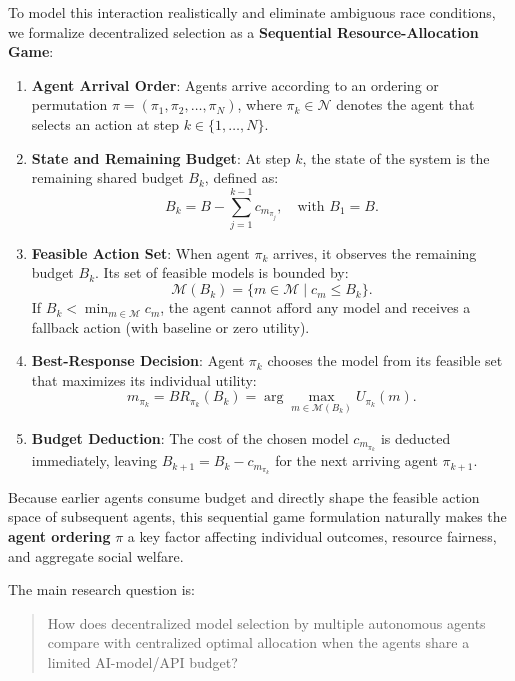 \documentclass{article}
\begin{document}
To model this interaction realistically and eliminate ambiguous race conditions, we formalize decentralized selection as a \textbf{Sequential Resource-Allocation Game}:
\begin{enumerate}[leftmargin=*]
    \item \textbf{Agent Arrival Order}: Agents arrive according to an ordering or permutation $\pi = (\pi_1, \pi_2, \ldots, \pi_N)$, where $\pi_k \in \mathcal{N}$ denotes the agent that selects an action at step $k \in \{1, \ldots, N\}$.
    \item \textbf{State and Remaining Budget}: At step $k$, the state of the system is the remaining shared budget $B_k$, defined as:
    \begin{equation}
        B_k = B - \sum_{j=1}^{k-1} c_{m_{\pi_j}}, \quad \text{with } B_1 = B.
    \end{equation}
    \item \textbf{Feasible Action Set}: When agent $\pi_k$ arrives, it observes the remaining budget $B_k$. Its set of feasible models is bounded by:
    \begin{equation}
        \mathcal{M}(B_k) = \{ m \in \mathcal{M} \mid c_m \leq B_k \}.
    \end{equation}
    If $B_k < \min_{m \in \mathcal{M}} c_m$, the agent cannot afford any model and receives a fallback action (with baseline or zero utility).
    \item \textbf{Best-Response Decision}: Agent $\pi_k$ chooses the model from its feasible set that maximizes its individual utility:
    \begin{equation}
        m_{\pi_k} = BR_{\pi_k}(B_k) = \arg\max_{m \in \mathcal{M}(B_k)} U_{\pi_k}(m).
    \end{equation}
    \item \textbf{Budget Deduction}: The cost of the chosen model $c_{m_{\pi_k}}$ is deducted immediately, leaving $B_{k+1} = B_k - c_{m_{\pi_k}}$ for the next arriving agent $\pi_{k+1}$.
\end{enumerate}

Because earlier agents consume budget and directly shape the feasible action space of subsequent agents, this sequential game formulation naturally makes the \textbf{agent ordering} $\pi$ a key factor affecting individual outcomes, resource fairness, and aggregate social welfare.

The main research question is: 

\begin{quote} 
How does decentralized model selection by multiple autonomous agents compare with centralized optimal allocation when the agents share a limited AI-model/API budget? 
\end{quote} 
\end{document}
